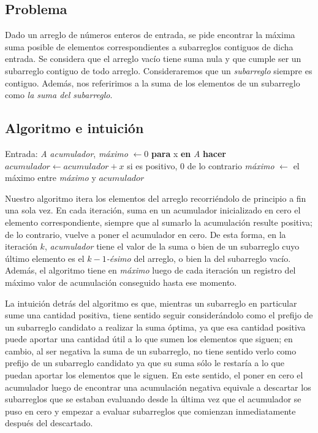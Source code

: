 \subsection{Problema}
Dado un arreglo de números enteros de entrada, se pide encontrar la máxima suma posible de elementos correspondientes a subarreglos contiguos de dicha entrada. Se considera que el arreglo vacío tiene suma nula y que cumple ser un subarreglo contiguo de todo arreglo. Consideraremos que un \textit{subarreglo} siempre es contiguo. Además, nos referirimos a la suma de los elementos de un subarreglo como \textit{la suma del subarreglo}.

\subsection{Algoritmo e intuición}

\noindent Entrada: \textit{A} \newline
\textit{acumulador}, \textit{máximo} $\leftarrow 0$ \newline
\textbf{para} x \textbf{en} \textit{A} \textbf{hacer} \newline
\indent $\mathit{acumulador} \leftarrow \mathit{acumulador + x}$ si es positivo, $0$ de lo contrario \newline
\indent \textit{máximo} $\leftarrow$ el máximo entre \textit{máximo} y $\mathit{acumulador}$

\bigskip

Nuestro algoritmo itera los elementos del arreglo recorriéndolo de principio a fin una sola vez. En cada iteración, suma en un acumulador inicializado en cero el elemento correspondiente, siempre que al sumarlo la acumulación resulte positiva; de lo contrario, vuelve a poner el acumulador en cero. De esta forma, en la iteración $k$, \textit{acumulador} tiene el valor de la suma o bien de un subarreglo cuyo último elemento es el $k-1$\textit{-ésimo} del arreglo, o bien la del subarreglo vacío. Además, el algoritmo tiene en \textit{máximo} luego de cada iteración un registro del máximo valor de acumulación conseguido hasta ese momento.

La intuición detrás del algoritmo es que, mientras un subarreglo en particular sume una cantidad positiva, tiene sentido seguir considerándolo como el prefijo de un subarreglo candidato a realizar la suma óptima, ya que esa cantidad positiva puede aportar una cantidad útil a lo que sumen los elementos que siguen; en cambio, al ser negativa la suma de un subarreglo, no tiene sentido verlo como prefijo de un subarreglo candidato ya que su suma sólo le restaría a lo que puedan aportar los elementos que le siguen. En este sentido, el poner en cero el acumulador luego de encontrar una acumulación negativa equivale a descartar los subarreglos que se estaban evaluando desde la última vez que el acumulador se puso en cero y empezar a evaluar subarreglos que comienzan inmediatamente después del descartado.

